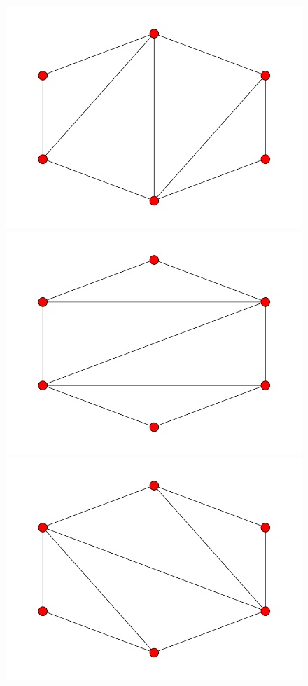 \documentclass[fontsize=10pt]{article}
\begin{document}
\begin{enumerate}
\begin{figure}[hbtp]
\includegraphics[scale=0.1]{imgs/hexagon/hexagon_7.png}
\includegraphics[scale=0.1]{imgs/hexagon/hexagon_8.png}
\includegraphics[scale=0.1]{imgs/hexagon/hexagon_9.png}

\end{figure}
\end{enumerate}
\end{document}
